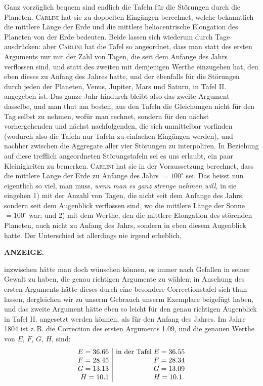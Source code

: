Ganz vorzüglich bequem sind endlich die Tafeln für die Störungen durch die Planeten. \textsc{Carlini} hat sie zu doppelten Eingängen berechnet, welche bekanntlich die mittlere Länge der Erde und die mittlere heliocentrische Elongation des Planeten von der Erde bedeuten. Beide lassen sich wiederum durch Tage ausdrücken: aber \textsc{Carlini} hat die Tafel so angeordnet, dass man statt des ersten Arguments nur mit der Zahl von Tagen, die seit dem Anfange des Jahrs verflossen sind, und statt des zweiten mit demjenigen Werthe einzugehen hat, den eben dieses zu Anfang des Jahres hatte, und der ebenfalls für die Störungen durch jeden der Planeten, Venus, Jupiter, Mars und Saturn, in Tafel II. angegeben ist. Das ganze Jahr hindurch bleibt also das zweite Argument dasselbe, und man thut am besten, aus den Tafeln die Gleichungen nicht für den Tag selbst zu nehmen, wofür man rechnet, sondern für den nächst vorhergehenden und nächst nachfolgenden, die sich unmittelbar vorfinden (wodurch also die Tafeln nur Tafeln zu einfachen Eingängen werden), und nachher zwischen die Aggregate aller vier Störungen zu interpoliren. In Beziehung auf diese trefflich angeordneten Störungstafeln sei es uns erlaubt, ein paar Kleinigkeiten zu bemerken. \textsc{Carlini} hat sie in der Voraussetzung berechnet, dass die mittlere Länge der Erde zu Anfange des Jahrs $= 100^\circ$ sei. Das heisst nun eigentlich so viel, man muss, \emph{wenn man es ganz strenge nehmen will,} in sie eingehen 1) mit der Anzahl von Tagen, die nicht seit dem Anfange des Jahrs, sondern seit dem Augenblick verflossen sind, wo die mittlere Länge der Sonne $= 100^\circ$ war; und 2) mit dem Werthe, den die mittlere Elongation des störenden Planeten, auch nicht zu Anfang des Jahrs, sondern in eben diesem Augenblick hatte. Der Unterschied ist allerdings nie irgend erheblich,\par
{}
\clearpage
\noindent{}%
%
\parbox[t]{\dimexpr\linewidth-24mm\relax}{\centering\footnotesize\bfseries ANZEIGE.\par}%
\makebox[12mm][r]{}\par\nobreak\medskip
\noindent inzwischen hätte man doch wünschen können, es immer nach Gefallen in seiner Gewalt zu haben, die genau richtigen Argumente zu wählen; in Ansehung des ersten Arguments hätte dieses durch eine besondere Correctionstafel sich thun lassen, dergleichen wir zu unserm Gebrauch unserm Exemplare beigefügt haben, und das zweite Argument hätte eben so leicht für den genau richtigen Augenblick in Tafel II. angesetzt werden können, als für den Anfang des Jahres. Im Jahre 1804 ist z.\,B. die Correction des ersten Arguments 1.09, und die genauen Werthe von $E$, $F$, $G$, $H$, sind: \[ \begin{array}{r|l@{\;}l} E = 36.66 & \text{in der Tafel} & E = 36.55\\ F = 28.45 & & F = 28.34\\ G = 13.13 & & G = 13.09\\ H = 10.1 & & H = 10.1 \end{array} \]

